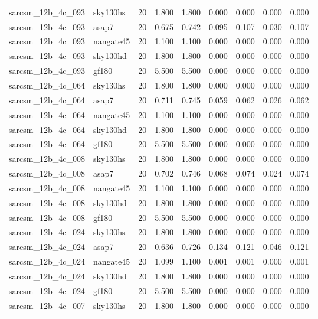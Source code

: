\begin{tabular}{llrrrrrrr}
sarcsm\_12b\_4c\_093 & sky130hs & 20 & 1.800 & 1.800 & 0.000 & 0.000 & 0.000 & 0.000 \\
sarcsm\_12b\_4c\_093 & asap7 & 20 & 0.675 & 0.742 & 0.095 & 0.107 & 0.030 & 0.107 \\
sarcsm\_12b\_4c\_093 & nangate45 & 20 & 1.100 & 1.100 & 0.000 & 0.000 & 0.000 & 0.000 \\
sarcsm\_12b\_4c\_093 & sky130hd & 20 & 1.800 & 1.800 & 0.000 & 0.000 & 0.000 & 0.000 \\
sarcsm\_12b\_4c\_093 & gf180 & 20 & 5.500 & 5.500 & 0.000 & 0.000 & 0.000 & 0.000 \\
sarcsm\_12b\_4c\_064 & sky130hs & 20 & 1.800 & 1.800 & 0.000 & 0.000 & 0.000 & 0.000 \\
sarcsm\_12b\_4c\_064 & asap7 & 20 & 0.711 & 0.745 & 0.059 & 0.062 & 0.026 & 0.062 \\
sarcsm\_12b\_4c\_064 & nangate45 & 20 & 1.100 & 1.100 & 0.000 & 0.000 & 0.000 & 0.000 \\
sarcsm\_12b\_4c\_064 & sky130hd & 20 & 1.800 & 1.800 & 0.000 & 0.000 & 0.000 & 0.000 \\
sarcsm\_12b\_4c\_064 & gf180 & 20 & 5.500 & 5.500 & 0.000 & 0.000 & 0.000 & 0.000 \\
sarcsm\_12b\_4c\_008 & sky130hs & 20 & 1.800 & 1.800 & 0.000 & 0.000 & 0.000 & 0.000 \\
sarcsm\_12b\_4c\_008 & asap7 & 20 & 0.702 & 0.746 & 0.068 & 0.074 & 0.024 & 0.074 \\
sarcsm\_12b\_4c\_008 & nangate45 & 20 & 1.100 & 1.100 & 0.000 & 0.000 & 0.000 & 0.000 \\
sarcsm\_12b\_4c\_008 & sky130hd & 20 & 1.800 & 1.800 & 0.000 & 0.000 & 0.000 & 0.000 \\
sarcsm\_12b\_4c\_008 & gf180 & 20 & 5.500 & 5.500 & 0.000 & 0.000 & 0.000 & 0.000 \\
sarcsm\_12b\_4c\_024 & sky130hs & 20 & 1.800 & 1.800 & 0.000 & 0.000 & 0.000 & 0.000 \\
sarcsm\_12b\_4c\_024 & asap7 & 20 & 0.636 & 0.726 & 0.134 & 0.121 & 0.046 & 0.121 \\
sarcsm\_12b\_4c\_024 & nangate45 & 20 & 1.099 & 1.100 & 0.001 & 0.001 & 0.000 & 0.001 \\
sarcsm\_12b\_4c\_024 & sky130hd & 20 & 1.800 & 1.800 & 0.000 & 0.000 & 0.000 & 0.000 \\
sarcsm\_12b\_4c\_024 & gf180 & 20 & 5.500 & 5.500 & 0.000 & 0.000 & 0.000 & 0.000 \\
sarcsm\_12b\_4c\_007 & sky130hs & 20 & 1.800 & 1.800 & 0.000 & 0.000 & 0.000 & 0.000 \\

\end{tabular}
